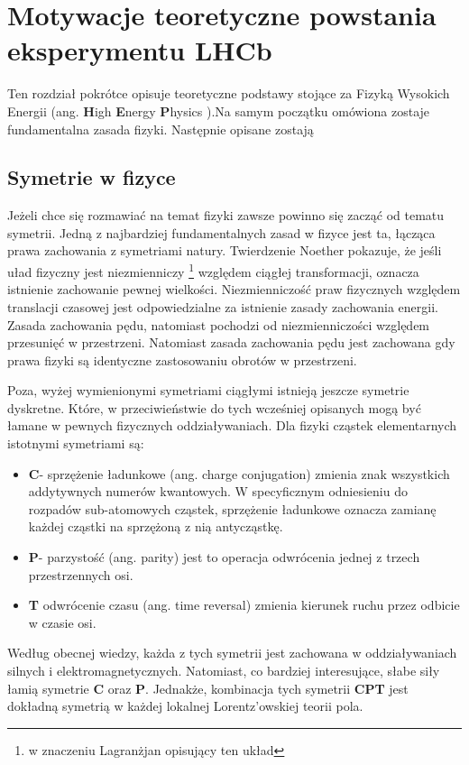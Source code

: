 \chapter{Motywacje teoretyczne powstania eksperymentu LHCb}

Ten rozdział pokrótce opisuje teoretyczne podstawy stojące za Fizyką Wysokich Energii (ang. \textbf{H}igh \textbf{E}nergy \textbf{P}hysics ).Na samym początku omówiona zostaje fundamentalna zasada fizyki. Następnie opisane zostają 

\section{Symetrie w fizyce}
Jeżeli chce się rozmawiać na temat fizyki zawsze powinno się zacząć od tematu symetrii. Jedną z najbardziej fundamentalnych zasad w fizyce jest ta, łącząca prawa zachowania z symetriami natury. Twierdzenie Noether pokazuje, że jeśli uład fizyczny jest niezmienniczy \footnote{w znaczeniu Lagranżjan opisujący ten układ} względem ciągłej transformacji, oznacza istnienie zachowanie pewnej wielkości. Niezmienniczość praw fizycznych względem translacji czasowej jest odpowiedzialne za istnienie zasady zachowania energii. Zasada zachowania pędu, natomiast pochodzi od niezmienniczości względem przesunięć w przestrzeni. Natomiast zasada zachowania pędu jest zachowana gdy prawa fizyki są identyczne zastosowaniu obrotów w przestrzeni. 

Poza, wyżej wymienionymi symetriami ciągłymi istnieją jeszcze symetrie dyskretne. Które, w przeciwieństwie do tych wcześniej opisanych mogą być łamane w pewnych fizycznych oddziaływaniach. Dla fizyki cząstek elementarnych istotnymi symetriami są:

\begin{itemize}
\item \textbf{C}- sprzężenie ładunkowe (ang. charge conjugation) zmienia znak wszystkich addytywnych numerów kwantowych. W specyficznym odniesieniu do rozpadów sub-atomowych cząstek, sprzężenie ładunkowe oznacza zamianę każdej cząstki na sprzężoną z nią antycząstkę.
\item \textbf{P}- parzystość (ang. parity) jest to operacja odwrócenia jednej z trzech przestrzennych osi.
\item \textbf{T} odwrócenie czasu (ang. time reversal) zmienia kierunek ruchu przez odbicie w czasie osi. 
\end{itemize}

Według obecnej wiedzy, każda z tych symetrii jest zachowana w oddziaływaniach silnych i elektromagnetycznych. Natomiast, co bardziej interesujące, słabe siły łamią symetrie \textbf{C} oraz \textbf{P}. Jednakże, kombinacja tych symetrii \textbf{CPT} jest dokładną symetrią w każdej lokalnej Lorentz'owskiej teorii pola.

